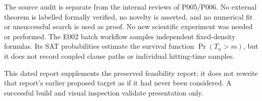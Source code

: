 \documentclass[11pt,a4paper]{article}
\begin{document}
The source audit is separate from the internal reviews of P005/P006.
No external theorem is labelled formally verified, no novelty is
asserted, and no numerical fit or unsuccessful search is used as proof.
No new scientific experiment was needed or performed. The E002 batch
workflow samples independent fixed-density formulas. Its SAT probabilities
estimate the survival function $\Pr(T_n>m)$, but it does not record coupled
clause paths or individual hitting-time samples.

This dated report supplements the preserved feasibility report; it does
not rewrite that report's earlier proposed target as if it had never
been considered. A successful build and visual inspection validate
presentation only.

\clearpage
{}
\begingroup\small\raggedright


\endgroup
\end{document}
